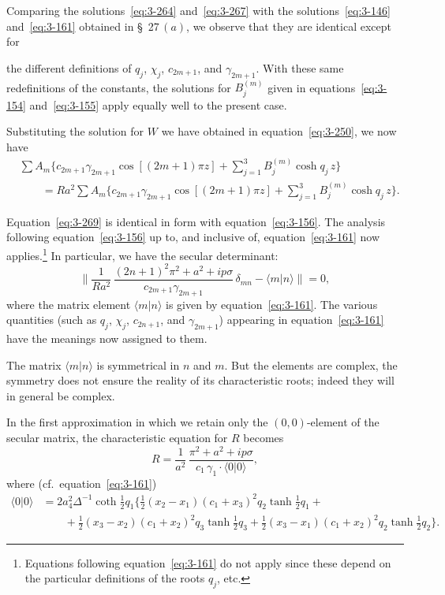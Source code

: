 Comparing the solutions~\eqref{eq:3-264} and~\eqref{eq:3-267} with the solutions~\eqref{eq:3-146} and~\eqref{eq:3-161} obtained in \S~27\,$(a)$, we observe that they are identical except for

\noindent the different definitions of $q_j$, $\chi_j$, $c_{2m+1}$, and $\gamma_{2m+1}$. With these same redefinitions of the constants, the solutions for $B_j^{(m)}$ given in equations~\eqref{eq:3-154} and~\eqref{eq:3-155} apply equally well to the present case.

Substituting the solution for $W$ we have obtained in equation~\eqref{eq:3-250}, we now have
\begin{equation}\label{eq:3-269}
\begin{split}
&\sum A_m \bigg\{c_{2m+1}\gamma_{2m+1}\cos[(2m+1)\pi z] + \sum_{j=1}^3 B_j^{(m)}\cosh q_j\,z\bigg\} \\
&\qquad = Ra^2\sum A_m \bigg\{c_{2m+1}\gamma_{2m+1}\cos[(2m+1)\pi z] + \sum_{j=1}^3 B_j^{(m)}\cosh q_j\,z\bigg\}.
\end{split}
\end{equation}

Equation~\eqref{eq:3-269} is identical in form with equation~\eqref{eq:3-156}. The analysis following equation~\eqref{eq:3-156} up to, and inclusive of, equation~\eqref{eq:3-161} now applies.\footnote{Equations following equation~\eqref{eq:3-161} do not apply since these depend on the particular definitions of the roots $q_j$, etc.} In particular, we have the secular determinant:
\begin{equation}\label{eq:3-270}
\bigg\|\frac{1}{Ra^2}\,\frac{(2n+1)^2\pi^2 + a^2 + ip\sigma}{c_{2m+1}\gamma_{2m+1}}\,\delta_{mn} - \langle m|n\rangle\bigg\| = 0,
\end{equation}
where the matrix element $\langle m|n\rangle$ is given by equation~\eqref{eq:3-161}. The various quantities (such as $q_j$, $\chi_j$, $c_{2n+1}$, and $\gamma_{2m+1}$) appearing in equation~\eqref{eq:3-161} have the meanings now assigned to them.

The matrix $\langle m|n\rangle$ is symmetrical in $n$ and $m$. But the elements are complex, the symmetry does not ensure the reality of its characteristic roots; indeed they will in general be complex.

In the first approximation in which we retain only the $(0, 0)$-element of the secular matrix, the characteristic equation for $R$ becomes
\begin{equation}\label{eq:3-271}
R = \frac{1}{a^2}\,\frac{\pi^2 + a^2 + ip\sigma}{c_1\,\gamma_1\cdot\langle 0|0\rangle},
\end{equation}
where (cf.\ equation~\eqref{eq:3-161})
\begin{equation}\label{eq:3-272}
\begin{split}
\langle 0|0\rangle &= 2a^2_4 \Delta^{-1} \coth\tfrac{1}{2}q_1\bigg\{\tfrac{1}{2}(x_2 - x_1)(c_1 + x_3)^2 q_2\tanh\tfrac{1}{2}q_1 + {} \\
&\qquad + \tfrac{1}{2}(x_3 - x_2)(c_1 + x_2)^2 q_3\tanh\tfrac{1}{2}q_3 + \tfrac{1}{2}(x_3 - x_1)(c_1 + x_2)^2 q_2\tanh\tfrac{1}{2}q_2\bigg\}.
\end{split}
\end{equation}


